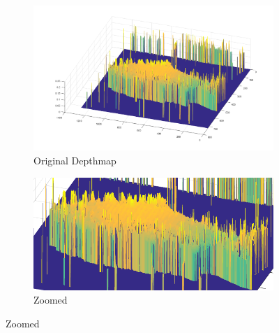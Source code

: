 \begin{figure}[H]
    \begin{subfigure}{0.41\textwidth}
        \includegraphics[width=\linewidth]{images/results/3D_plots/original_3D_63}
        \caption{Original Depthmap}
    \end{subfigure}\hspace*{\fill}
    \begin{subfigure}{0.57\textwidth}
        \includegraphics[width=\linewidth]{images/results/3D_plots/zoomed_original_3D_63}
        \caption{Zoomed}
    \end{subfigure}
    

\end{figure}
